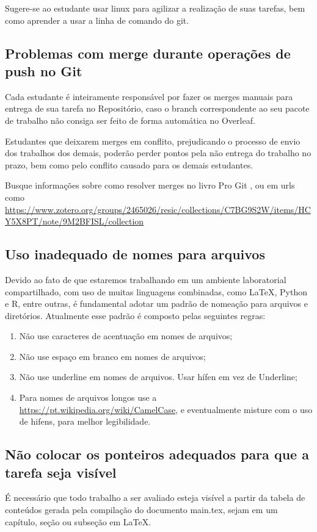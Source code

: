 Sugere-se ao estudante usar linux para agilizar a realização de suas tarefas, bem como aprender a usar a linha de comando do git.

\subsection{Problemas com merge durante operações de push no Git}

Cada estudante é inteiramente responsável por fazer os merges manuais para entrega de sua tarefa no Repositório, caso o branch correspondente ao seu pacote de trabalho não consiga ser feito de forma automática no Overleaf. 

Estudantes que deixarem merges em conflito, prejudicando o processo de envio dos trabalhos dos demais, poderão perder pontos pela não entrega do trabalho no prazo, bem como pelo conflito causado para os demais estudantes. 

Busque informações sobre como resolver merges no livro Pro Git \cite{chacon_pro_2014}, ou em  urls como \url{https://www.zotero.org/groups/2465026/resic/collections/C7BG9S2W/items/HCY5X8PT/note/9M2BFISL/collection}

\subsection{Uso inadequado de nomes para arquivos}

Devido ao fato de que estaremos trabalhando em um ambiente laboratorial compartilhado, com uso de muitas linguagens combinadas, como \LaTeX, Python e R, entre outras, é fundamental adotar um padrão de nomeação para arquivos e diretórios. Atualmente esse padrão é composto pelas seguintes regras:
\begin{enumerate}
    \item Não use caracteres de acentuação em nomes de arquivos;
    \item Não use espaço em branco em nomes de arquivos;
    \item Não use underline em nomes de arquivos. Usar hífen em vez de Underline;
    \item Para nomes de arquivos longos use a \url{https://pt.wikipedia.org/wiki/CamelCase}, e eventualmente misture com o uso de hifens, para melhor legibilidade.
\end{enumerate}

\subsection{Não colocar os ponteiros adequados para que a tarefa seja visível}

É necessário que todo trabalho a ser avaliado esteja visível a partir da tabela de conteúdos gerada pela compilação do documento main.tex, sejam em um capítulo, seção ou subseção em \LaTeX.
